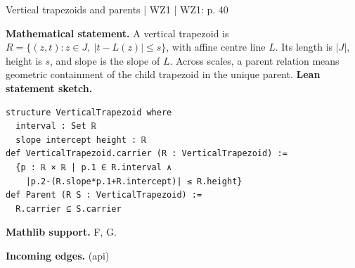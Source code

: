 \documentclass[10pt,a4paper]{article}
\newcommand{\nodecard}[1]{\hyperlink{node-#1}{\texttt{\detokenize{#1}}}}
\begin{document}
\begin{minipage}{\linewidth}
\hypertarget{node-Dtrap}{}
\begin{tcolorbox}[colback=white,colframe=regularityfg,colbacktitle=regularitybg,coltitle=ink,boxrule=0.45pt,arc=1.6mm,left=3mm,right=3mm,top=2mm,bottom=2mm,title={\sffamily\bfseries WZ1 Definition 5.1 \hfill \texttt{Dtrap}}]
{\sffamily\small\color{muted}Vertical trapezoids and parents | WZ1 | WZ1: p. 40}\par
\textbf{Mathematical statement.} A vertical trapezoid is $R=\{(z,t):z\in J,\ |t-L(z)|\le s\}$, with affine centre line $L$.
Its length is $|J|$, height is $s$, and slope is the slope of $L$.
Across scales, a parent relation means geometric containment of the child trapezoid in the unique parent.
\smallskip\textbf{Lean statement sketch.}
\begin{Verbatim}[fontsize=\small,breaklines=true,breakanywhere=true,tabsize=2]
structure VerticalTrapezoid where
  interval : Set ℝ
  slope intercept height : ℝ
def VerticalTrapezoid.carrier (R : VerticalTrapezoid) :=
  {p : ℝ × ℝ | p.1 ∈ R.interval ∧
    |p.2-(R.slope*p.1+R.intercept)| ≤ R.height}
def Parent (R S : VerticalTrapezoid) :=
  R.carrier ⊆ S.carrier
\end{Verbatim}
{\footnotesize\textbf{Mathlib support.} F, G.\par
\textbf{Incoming edges.} \nodecard{Ientropy} (api)\par}

\end{tcolorbox}\end{minipage}\par\medskip
\end{document}

